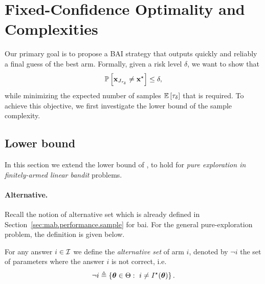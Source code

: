 \section{Fixed-Confidence Optimality and Complexities}\label{sec:lgc.complexity}

Our primary goal is to propose a BAI strategy that outputs quickly and reliably a final guess of the best arm. Formally, given a risk level $\delta$, we want to show that
\[
  \mathbb{P}\left[{\bf x}_{J_{\tau_\delta}}\neq {\bf x}^\star\right] \leq \delta,
\]
while minimizing the expected number of samples $\mathbb{E}\left[\tau_\delta\right]$ that is required. To achieve this objective, we first investigate the lower bound of the sample complexity.

\subsection{Lower bound}\label{sec:lgc.complexity.lb}

In this section we extend the lower bound of \citet{garivier2016tracknstop}, to hold for \emph{pure exploration in finitely-armed linear bandit} problems.

\paragraph{Alternative.}
Recall the notion of \gls{alternative set} which is already defined in Section~\ref{sec:mab.performance.sample} for \gls{bai}. For the general pure-exploration problem, the definition is given below.

\begin{definition}
\begin{leftbar}[defnbar]
For any answer $i\in\mathcal{I}$ we define the \emph{alternative set} of arm $i$, denoted by $\neg i$ the set of parameters where the answer $i$ is not correct, i.e.
\[
    \neg i \triangleq \{{\boldsymbol \theta}\in\Theta:\ i\neq I^\star({\boldsymbol \theta})\}\,.
\]
\end{leftbar}
\end{definition}


